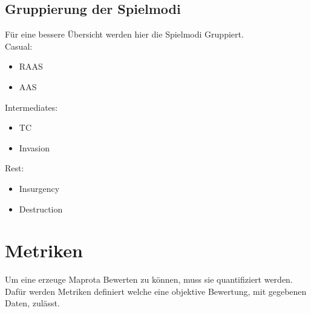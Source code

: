 \documentclass[a4paper, 11pt]{scrreprt}
\begin{document}
        \subsection{Gruppierung der Spielmodi}
                Für eine bessere Übersicht werden hier die Spielmodi Gruppiert.\\
                Casual:
                \begin{itemize}
                    \item \ac{RAAS}
                    \item \ac{AAS}
                \end{itemize}
                Intermediates:
                \begin{itemize}
                    \item \ac{TC}
                    \item Invasion
                \end{itemize}
                Rest:
                \begin{itemize}
                    \item Insurgency
                    \item Destruction 
                \end{itemize}
    
    \section{Metriken}
    Um eine erzeuge Maprota Bewerten zu können, muss sie quantifiziert werden. 
    Dafür werden Metriken definiert welche eine objektive Bewertung, mit gegebenen Daten, zulässt.
\end{document}
